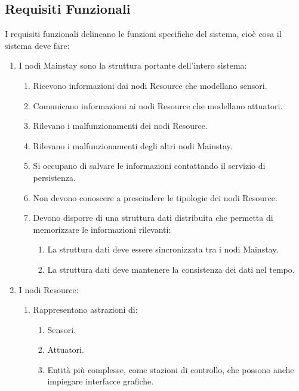 \documentclass[12pt]{article}
\begin{document}
\subsection{Requisiti Funzionali}
I requisiti funzionali delineano le funzioni specifiche del sistema, cioè cosa il sistema deve fare:
\begin{enumerate}
    \item I nodi Mainstay sono la struttura portante dell'intero sistema:
          \begin{enumerate}
              \item Ricevono informazioni dai nodi Resource che modellano sensori.
              \item Comunicano informazioni ai nodi Resource che modellano attuatori.
              \item Rilevano i malfunzionamenti dei nodi Resource.
              \item Rilevano i malfunzionamenti degli altri nodi Mainstay.
              \item Si occupano di salvare le informazioni contattando il servizio di persistenza.
              \item Non devono conoscere a prescindere le tipologie dei nodi Resource.
              \item Devono disporre di una struttura dati distribuita che permetta di memorizzare le informazioni rilevanti:
                    \begin{enumerate}
                        \item La struttura dati deve essere sincronizzata tra i nodi Mainstay.
                        \item La struttura dati deve mantenere la consistenza dei dati nel tempo.
                    \end{enumerate}
          \end{enumerate}
    \item I nodi Resource:
          \begin{enumerate}
              \item Rappresentano astrazioni di:
                    \begin{enumerate}
                        \item Sensori.
                        \item Attuatori.
                        \item Entità più complesse, come stazioni di controllo, che possono anche impiegare interfacce grafiche.
                    \end{enumerate}

\end{enumerate}
\end{enumerate}
\end{document}
